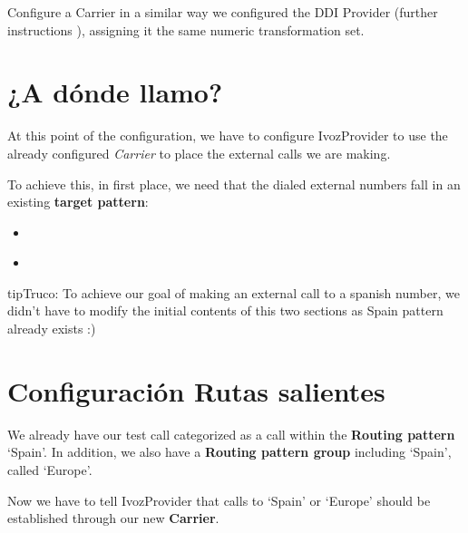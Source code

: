 \documentclass[letterpaper,10pt,spanish]{sphinxmanual}
\begin{document}
Configure a Carrier in a similar way we configured the DDI Provider (further instructions {\hyperref[administration_portal/brand/providers/carriers:carriers]{}}),
assigning it the same numeric transformation set.


\section{¿A dónde llamo?}
\label{getting_started/external_outgoing_calls/where_do_i_call::doc}\label{getting_started/external_outgoing_calls/where_do_i_call:where-do-i-call}
At this point of the configuration, we have to configure IvozProvider to use the
already configured \emph{Carrier} to place the external calls we are making.

To achieve this, in first place, we need that the dialed external numbers fall
in an existing \textbf{target pattern}:
\begin{itemize}
\item {} 
{\hyperref[administration_portal/brand/routing/routing_patterns:routing\string-patterns]{}}

\item {} 
{\hyperref[administration_portal/brand/routing/routing_patterns_groups:routing\string-pattern\string-groups]{}}

\end{itemize}

\begin{notice}{tip}{Truco:}
To achieve our goal of making an external call to a spanish number, we didn't have
to modify the initial contents of this two sections as Spain pattern already exists :)
\end{notice}


\section{Configuración Rutas salientes}
\label{getting_started/external_outgoing_calls/call_routing:outgoing-routing-configuration}\label{getting_started/external_outgoing_calls/call_routing::doc}
We already have our test call categorized as a call within the \textbf{Routing pattern}
`Spain'. In addition, we also have a \textbf{Routing pattern group} including `Spain',
called `Europe'.

Now we have to tell IvozProvider that calls to `Spain' or `Europe' should be
established through our new \textbf{Carrier}.
\end{document}
